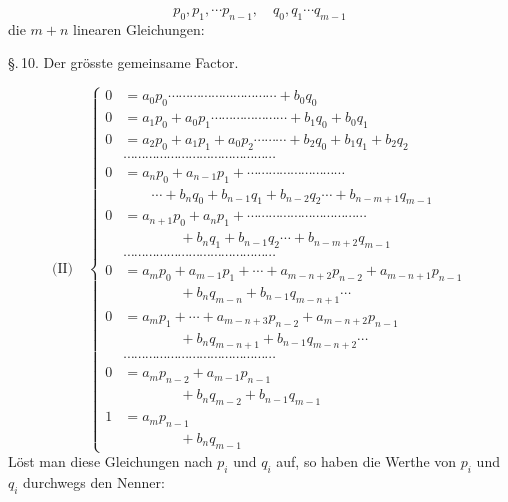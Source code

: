 \documentclass[11pt]{article}
\providecommand{\weberpage}[1]{}
\begin{document}
\[
p_0, p_1, \cdots p_{n-1}, \quad q_0, q_1 \cdots q_{m-1}
\]
die $m+n$ linearen Gleichungen:


\weberpage{137}
\S.\,10. Der grösste gemeinsame Factor.

\[
\text{(II)}\quad
\left\{
\begin{aligned}
0 &= a_0 p_0 \cdots\cdots\cdots\cdots\cdots\cdots\cdots\cdots\cdots\cdots + b_0 q_0\\
0 &= a_1 p_0 + a_0 p_1 \cdots\cdots\cdots\cdots\cdots\cdots\cdots + b_1 q_0 + b_0 q_1\\
0 &= a_2 p_0 + a_1 p_1 + a_0 p_2 \cdots\cdots\cdots + b_2 q_0 + b_1 q_1 + b_2 q_2\\
&\cdots\cdots\cdots\cdots\cdots\cdots\cdots\cdots\cdots\cdots\cdots\cdots\cdots\cdots\\
0 &= a_n p_0 + a_{n-1} p_1 + \cdots\cdots\cdots\cdots\cdots\cdots\cdots\cdots\cdots\\
&\qquad\cdots + b_n q_0 + b_{n-1} q_1 + b_{n-2} q_2\cdots + b_{n-m+1} q_{m-1}\\
0 &= a_{n+1} p_0 + a_n p_1 + \cdots\cdots\cdots\cdots\cdots\cdots\cdots\cdots\cdots\cdots\cdots\\
&\qquad\qquad + b_n q_1 + b_{n-1} q_2 \cdots + b_{n-m+2} q_{m-1}\\
&\cdots\cdots\cdots\cdots\cdots\cdots\cdots\cdots\cdots\cdots\cdots\cdots\cdots\cdots\\
0 &= a_m p_0 + a_{m-1} p_1 + \cdots + a_{m-n+2} p_{n-2} + a_{m-n+1} p_{n-1}\\
&\qquad\qquad + b_n q_{m-n} + b_{n-1} q_{m-n+1}\cdots\\
0 &= a_m p_1 + \cdots + a_{m-n+3} p_{n-2} + a_{m-n+2} p_{n-1}\\
&\qquad\qquad + b_n q_{m-n+1} + b_{n-1} q_{m-n+2}\cdots\\
&\cdots\cdots\cdots\cdots\cdots\cdots\cdots\cdots\cdots\cdots\cdots\cdots\cdots\cdots\\
0 &= a_m p_{n-2} + a_{m-1} p_{n-1}\\
&\qquad\qquad + b_n q_{m-2} + b_{n-1} q_{m-1}\\
1 &= a_m p_{n-1}\\
&\qquad\qquad + b_n q_{m-1}
\end{aligned}
\right.
\]
Löst man diese Gleichungen nach $p_i$ und $q_i$ auf, so haben die Werthe
von $p_i$ und $q_i$ durchwegs den Nenner:
\end{document}
